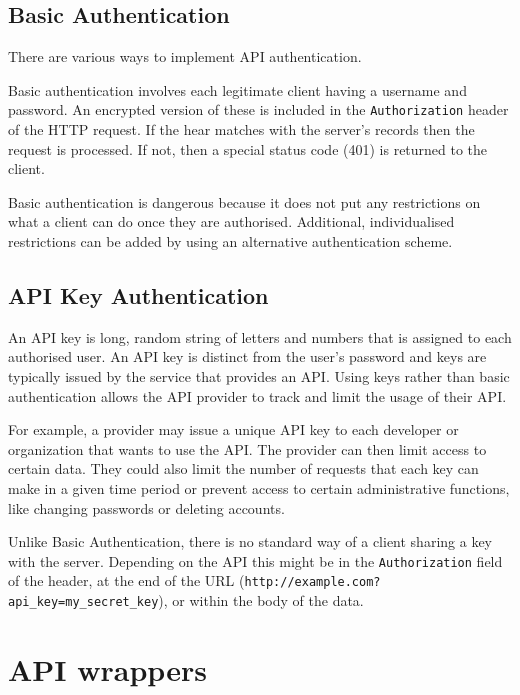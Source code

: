 \documentclass[
  12pt,
]{book}
\begin{document}
\hypertarget{basic-authentication}{%
\subsection{Basic Authentication}\label{basic-authentication}}

There are various ways to implement API authentication.

Basic authentication involves each legitimate client having a username and password. An encrypted version of these is included in the \texttt{Authorization} header of the HTTP request. If the hear matches with the server's records then the request is processed. If not, then a special status code (401) is returned to the client.

Basic authentication is dangerous because it does not put any restrictions on what a client can do once they are authorised. Additional, individualised restrictions can be added by using an alternative authentication scheme.

\hypertarget{api-key-authentication}{%
\subsection{API Key Authentication}\label{api-key-authentication}}

An API key is long, random string of letters and numbers that is assigned to each authorised user. An API key is distinct from the user's password and keys are typically issued by the service that provides an API. Using keys rather than basic authentication allows the API provider to track and limit the usage of their API.

For example, a provider may issue a unique API key to each developer or organization that wants to use the API. The provider can then limit access to certain data. They could also limit the number of requests that each key can make in a given time period or prevent access to certain administrative functions, like changing passwords or deleting accounts.

Unlike Basic Authentication, there is no standard way of a client sharing a key with the server. Depending on the API this might be in the \texttt{Authorization} field of the header, at the end of the URL (\texttt{http://example.com?api\_key=my\_secret\_key}), or within the body of the data.

\hypertarget{api-wrappers}{%
\section{API wrappers}\label{api-wrappers}}
\end{document}

